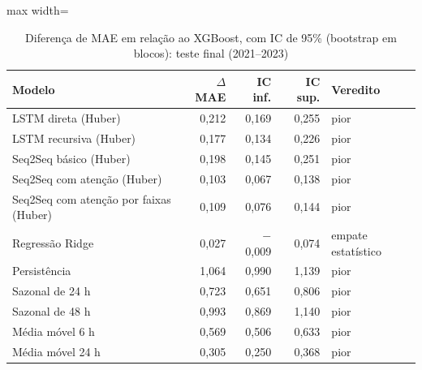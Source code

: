 \begin{table}[!htbp]
    \centering
    \caption{Diferença de MAE em relação ao XGBoost, com IC de 95\% (bootstrap em blocos): teste final (2021--2023)}
    \label{tab:pareado_holdout}
    \small
    \begin{adjustbox}{max width=\textwidth}
    \begin{tabular}{lrrrl}
        \toprule
        Modelo & $\Delta$ MAE & IC inf. & IC sup. & Veredito \\
        \midrule
        LSTM direta (Huber) & 0,212 & 0,169 & 0,255 & pior \\
        LSTM recursiva (Huber) & 0,177 & 0,134 & 0,226 & pior \\
        Seq2Seq básico (Huber) & 0,198 & 0,145 & 0,251 & pior \\
        Seq2Seq com atenção (Huber) & 0,103 & 0,067 & 0,138 & pior \\
        Seq2Seq com atenção por faixas (Huber) & 0,109 & 0,076 & 0,144 & pior \\
        Regressão Ridge & 0,027 & $-$0,009 & 0,074 & empate estatístico \\
        \midrule
        Persistência & 1,064 & 0,990 & 1,139 & pior \\
        Sazonal de 24 h & 0,723 & 0,651 & 0,806 & pior \\
        Sazonal de 48 h & 0,993 & 0,869 & 1,140 & pior \\
        Média móvel 6 h & 0,569 & 0,506 & 0,633 & pior \\
        Média móvel 24 h & 0,305 & 0,250 & 0,368 & pior \\
        \bottomrule
    \end{tabular}
    \end{adjustbox}
\end{table}
